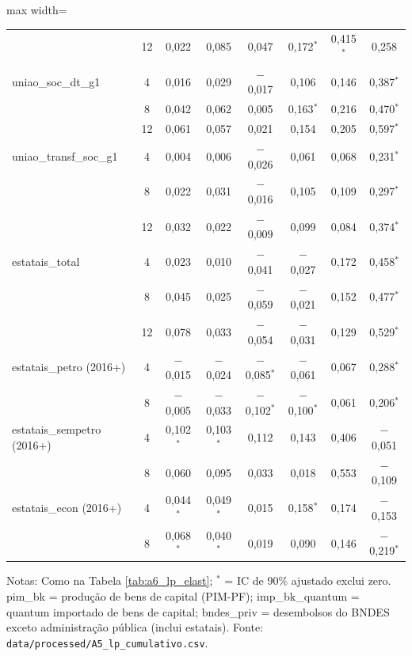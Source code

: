 \begin{table}[htbp]
\begin{adjustbox}{max width=\linewidth}
\begin{tabular}{lccccccc}
 & 12 & 0{,}022 & 0{,}085 & 0{,}047 & 0{,}172$^{*}$ & 0{,}415$^{*}$ & 0{,}258 \\
uniao\_soc\_dt\_g1 & 4 & 0{,}016 & 0{,}029 & $-$0{,}017 & 0{,}106 & 0{,}146 & 0{,}387$^{*}$ \\
 & 8 & 0{,}042 & 0{,}062 & 0{,}005 & 0{,}163$^{*}$ & 0{,}216 & 0{,}470$^{*}$ \\
 & 12 & 0{,}061 & 0{,}057 & 0{,}021 & 0{,}154 & 0{,}205 & 0{,}597$^{*}$ \\
uniao\_transf\_soc\_g1 & 4 & 0{,}004 & 0{,}006 & $-$0{,}026 & 0{,}061 & 0{,}068 & 0{,}231$^{*}$ \\
 & 8 & 0{,}022 & 0{,}031 & $-$0{,}016 & 0{,}105 & 0{,}109 & 0{,}297$^{*}$ \\
 & 12 & 0{,}032 & 0{,}022 & $-$0{,}009 & 0{,}099 & 0{,}084 & 0{,}374$^{*}$ \\
estatais\_total & 4 & 0{,}023 & 0{,}010 & $-$0{,}041 & $-$0{,}027 & 0{,}172 & 0{,}458$^{*}$ \\
 & 8 & 0{,}045 & 0{,}025 & $-$0{,}059 & $-$0{,}021 & 0{,}152 & 0{,}477$^{*}$ \\
 & 12 & 0{,}078 & 0{,}033 & $-$0{,}054 & $-$0{,}031 & 0{,}129 & 0{,}529$^{*}$ \\
estatais\_petro (2016+) & 4 & $-$0{,}015 & $-$0{,}024 & $-$0{,}085$^{*}$ & $-$0{,}061 & 0{,}067 & 0{,}288$^{*}$ \\
 & 8 & $-$0{,}005 & $-$0{,}033 & $-$0{,}102$^{*}$ & $-$0{,}100$^{*}$ & 0{,}061 & 0{,}206$^{*}$ \\
estatais\_sempetro (2016+) & 4 & 0{,}102$^{*}$ & 0{,}103$^{*}$ & 0{,}112 & 0{,}143 & 0{,}406 & $-$0{,}051 \\
 & 8 & 0{,}060 & 0{,}095 & 0{,}033 & 0{,}018 & 0{,}553 & $-$0{,}109 \\
estatais\_econ (2016+) & 4 & 0{,}044$^{*}$ & 0{,}049$^{*}$ & 0{,}015 & 0{,}158$^{*}$ & 0{,}174 & $-$0{,}153 \\
 & 8 & 0{,}068$^{*}$ & 0{,}040$^{*}$ & 0{,}019 & 0{,}090 & 0{,}146 & $-$0{,}219$^{*}$ \\
\bottomrule
\end{tabular}
\end{adjustbox}
\begin{minipage}{0.97\linewidth}\footnotesize
\medskip Notas: Como na Tabela \ref{tab:a6_lp_elast}; $^{*}$ = IC de 90\% ajustado exclui zero. pim\_bk = produ\c{c}\~ao de bens de capital (PIM-PF); imp\_bk\_quantum = quantum importado de bens de capital; bndes\_priv = desembolsos do BNDES exceto administra\c{c}\~ao p\'ublica (inclui estatais). Fonte: \texttt{data/processed/A5\_lp\_cumulativo.csv}.
\end{minipage}
\end{table}


